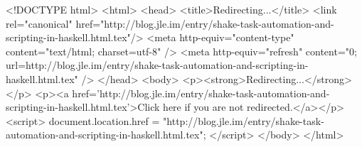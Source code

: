 <!DOCTYPE html>
<html>
<head>
<title>Redirecting...</title>
<link rel="canonical" href="http://blog.jle.im/entry/shake-task-automation-and-scripting-in-haskell.html.tex"/>
<meta http-equiv="content-type" content="text/html; charset=utf-8" />
<meta http-equiv="refresh" content="0; url=http://blog.jle.im/entry/shake-task-automation-and-scripting-in-haskell.html.tex" />
</head>
<body>
  <p><strong>Redirecting...</strong></p>
  <p><a href='http://blog.jle.im/entry/shake-task-automation-and-scripting-in-haskell.html.tex'>Click here if you are not redirected.</a></p>
  <script>
    document.location.href = "http://blog.jle.im/entry/shake-task-automation-and-scripting-in-haskell.html.tex";
  </script>
</body>
</html>
